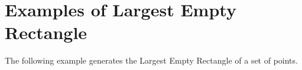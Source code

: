 \section{Examples of Largest Empty Rectangle}

The following example generates the Largest Empty Rectangle of a set
of points.






